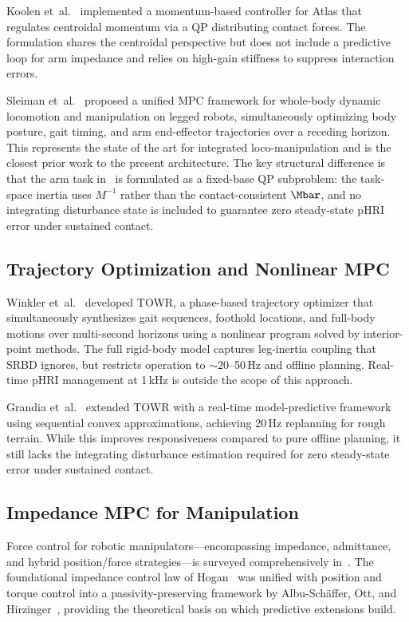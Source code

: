 Koolen et~al.~\cite{koolen2016design} implemented a momentum-based
controller for Atlas that regulates centroidal momentum via a QP
distributing contact forces.
The formulation shares the centroidal perspective but does not include a
predictive loop for arm impedance and relies on high-gain stiffness to
suppress interaction errors.

Sleiman et~al.~\cite{sleiman2021unified} proposed a unified MPC framework
for whole-body dynamic locomotion and manipulation on legged robots,
simultaneously optimizing body posture, gait timing, and arm end-effector
trajectories over a receding horizon.
This represents the state of the art for integrated loco-manipulation and
is the closest prior work to the present architecture.
The key structural difference is that the arm task in~\cite{sleiman2021unified}
is formulated as a fixed-base QP subproblem: the task-space inertia uses
$M^{-1}$ rather than the contact-consistent $\Mbar$, and no integrating
disturbance state is included to guarantee zero steady-state pHRI error
under sustained contact.

\subsection{Trajectory Optimization and Nonlinear MPC}

Winkler et~al.~\cite{winkler2018gait} developed TOWR, a phase-based
trajectory optimizer that simultaneously synthesizes gait sequences,
foothold locations, and full-body motions over multi-second horizons using a
nonlinear program solved by interior-point methods.
The full rigid-body model captures leg-inertia coupling that SRBD ignores,
but restricts operation to ${\sim}20$--50\,Hz and offline planning.
Real-time pHRI management at 1\,kHz is outside the scope of this approach.

Grandia et~al.~\cite{grandia2023perceptive} extended TOWR with a real-time
model-predictive framework using sequential convex approximations, achieving
20\,Hz replanning for rough terrain.
While this improves responsiveness compared to pure offline planning, it
still lacks the integrating disturbance estimation required for zero
steady-state error under sustained contact.

\subsection{Impedance MPC for Manipulation}

Force control for robotic manipulators---encompassing impedance, admittance,
and hybrid position/force strategies---is surveyed comprehensively
in~\cite{villani2016force}.
The foundational impedance control law of Hogan~\cite{hogan1985impedance}
was unified with position and torque control into a passivity-preserving
framework by Albu-Sch\"{a}ffer, Ott, and
Hirzinger~\cite{albu2007unified}, providing the theoretical basis on which
predictive extensions build.

